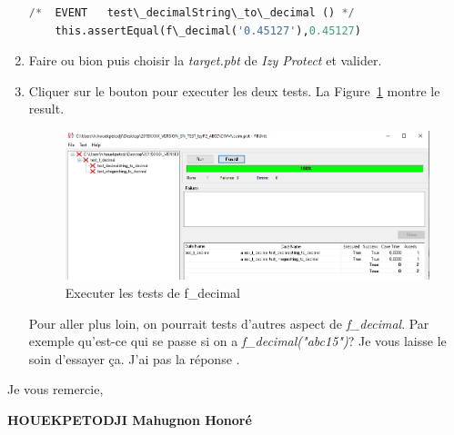\documentclass[french]{article}
\theoremstyle{definition}
\begin{document}
\begin{enumerate}
\begin{lstlisting}[language=Python, caption= f\_decimal test 2]
    /*	EVENT	test\_decimalString\_to\_decimal ()	*/
    this.assertEqual(f\_decimal('0.45127'),0.45127)
\end{lstlisting}
\item  Faire  ou bion  puis choisir la \textit{target.pbt} de \textit{Izy Protect} et valider.
\item Cliquer sur le bouton  pour executer les deux tests. La Figure~\ref{fig:testPass} montre le result. 
\begin{figure}[!htbp]
    \begin{center}
    \includegraphics[width=.8\linewidth]{./uf_decimal_tests_pass.png}
    \caption{Executer les tests de f\_decimal}
    \label{fig:testPass}
    \end{center}
  \end{figure}
  Pour aller plus loin, on pourrait tests d'autres aspect de \textit{f\_decimal}. 
  Par exemple qu'est-ce qui se passe si on a \textit{f\_decimal("abc15")}?
 Je vous laisse le soin d'essayer ça.
  J'ai pas la réponse \smiley.
\end{enumerate}
  
\newpage
Je vous remercie,

\textbf{HOUEKPETODJI Mahugnon Honoré} \blacksmiley
% 
% 
\end{document}
